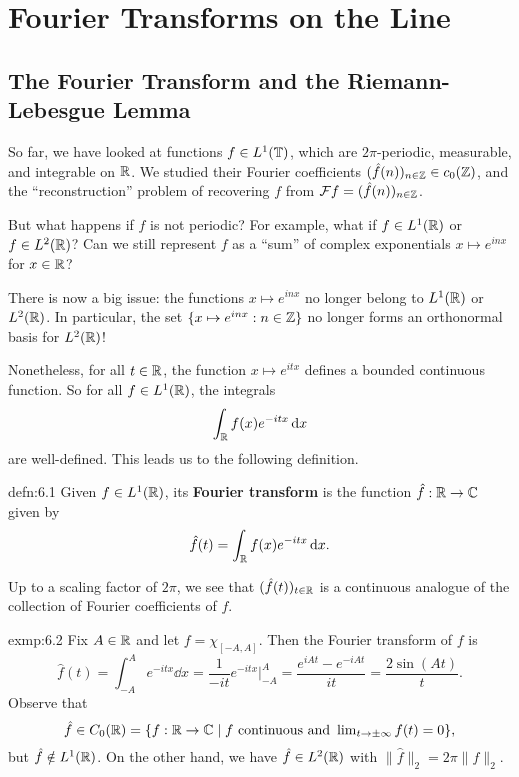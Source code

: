 \section{Fourier Transforms on the Line} \label{sec:6}

\subsection{The Fourier Transform and the Riemann-Lebesgue Lemma} \label{subsec:6.1}
So far, we have looked at functions $f \in L^1(\mathbb{T})$, which are 
$2\pi$-periodic, measurable, and integrable on $\mathbb{R}$. We studied their 
Fourier coefficients $(\hat f(n))_{n\in\mathbb{Z}} \in c_0(\mathbb{Z})$, and the 
``reconstruction'' problem of recovering $f$ from ${\cal F}f = 
(\hat f(n))_{n\in\mathbb{Z}}$.

But what happens if $f$ is not periodic? For example, what if 
$f \in L^1(\mathbb{R})$ or $f \in L^2(\mathbb{R})$? Can we still represent $f$ as a 
``sum'' of complex exponentials $x \mapsto e^{inx}$ for $x \in \mathbb{R}$? 

There is now a big issue: the functions $x \mapsto e^{inx}$ no longer 
belong to $L^1(\mathbb{R})$ or $L^2(\mathbb{R})$. In particular, the set 
$\{x \mapsto e^{inx} : n \in \mathbb{Z}\}$ no longer forms an orthonormal 
basis for $L^2(\mathbb{R})$! 

Nonetheless, for all $t \in \mathbb{R}$, the function $x \mapsto e^{itx}$ 
defines a bounded continuous function. So for all $f \in L^1(\mathbb{R})$, the 
integrals 
\[ \int_{\mathbb{R}} f(x) e^{-itx}\,\mathrm{d} x \] 
are well-defined. This leads us to the following definition. 

\begin{defn}{defn:6.1}
    Given $f \in L^1(\mathbb{R})$, its {\bf Fourier transform} is the function 
    $\hat f : \mathbb{R} \to \mathbb{C}$ given by 
    \[ \hat f(t) = \int_{\mathbb{R}} f(x) e^{-itx}\,\mathrm{d} x. \] 
\end{defn}

Up to a scaling factor of $2\pi$, we see that $(\hat f(t))_{t\in\mathbb{R}}$ 
is a continuous analogue of the collection of Fourier coefficients of $f$. 

\begin{exmp}{exmp:6.2}
    Fix $A \in \mathbb{R}$ and let $f = \chi_{[-A, A]}$. Then the Fourier transform 
    of $f$ is 
    \[ \hat f(t) = \int_{-A}^A e^{-itx}\dd x = \frac{1}{-it} e^{-itx} 
    \bigg|_{-A}^A = \frac{e^{iAt} - e^{-iAt}}{it} = \frac{2\sin(At)}{t}. \] 
    Observe that 
    \[ \hat f \in C_0(\mathbb{R}) = \{f : \mathbb{R} \to \mathbb{C} \mid f \text{ continuous and } 
    \textstyle\lim_{t\to\pm\infty} f(t) = 0\}, \] 
    but $\hat f \notin L^1(\mathbb{R})$. On the other hand, we have $\hat f \in 
    L^2(\mathbb{R})$ with $\|\hat f\|_2 = 2\pi\|f\|_2$. 
\end{exmp}

